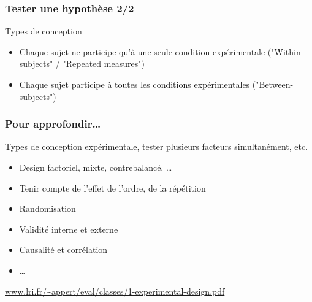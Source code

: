\documentclass[xcolor=dvipsnames,english]{beamer}
\begin{document}
\begin{frame}
  \frametitle{Tester une hypothèse 2/2}


  \begin{block}{Types de conception}
    \begin{itemize}
      \item<1-> Chaque sujet ne participe qu'à une seule condition expérimentale ("Within-subjects" / "Repeated measures")
      \item<2-> Chaque sujet participe à toutes les conditions expérimentales ("Between-subjects")
    \end{itemize}
  \end{block}
  

  
\end{frame}


\begin{frame}
  \frametitle{Pour approfondir\dots}

  Types de conception expérimentale, tester plusieurs facteurs simultanément, etc.
  \begin{itemize}
    \item Design factoriel, mixte, contrebalancé, \dots
    \item Tenir compte de l'effet de l'ordre, de la répétition
    \item Randomisation
    \item Validité interne et externe
    \item Causalité et corrélation
    \item \dots
  \end{itemize}

  \url{www.lri.fr/~appert/eval/classes/1-experimental-design.pdf}

\end{frame}
\end{document}
